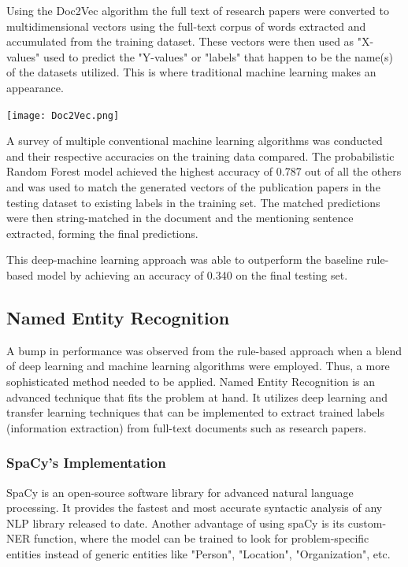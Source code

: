\documentclass[twocolumn]{article}
\begin{document}
Using the Doc2Vec algorithm the full text of research papers were converted to multidimensional vectors using the full-text corpus of words extracted and accumulated from the training dataset. These vectors were then used as "X-values" used to predict the "Y-values" or "labels" that happen to be the name(s) of the datasets utilized. This is where traditional machine learning makes an appearance.\par 

\begin{center}
\hspace*{-0.2cm}
\texttt{[image: Doc2Vec.png]}
\end{center}

A survey of multiple conventional machine learning algorithms was conducted and their respective accuracies on the training data compared. The probabilistic Random Forest model achieved the highest accuracy of 0.787 out of all the others and was used to match the generated vectors of the publication papers in the testing dataset to existing labels in the training set. The matched predictions were then string-matched in the document and the mentioning sentence extracted, forming the final predictions.\par

This deep-machine learning approach was able to outperform the baseline rule-based model by achieving an accuracy of 0.340 on the final testing set.
\subsection{Named Entity Recognition}
A bump in performance was observed from the rule-based approach when a blend of deep learning and machine learning algorithms were employed. Thus, a more sophisticated method needed to be applied. Named Entity Recognition is an advanced technique that fits the problem at hand. It utilizes deep learning and transfer learning techniques that can be implemented to extract trained labels (information extraction) from full-text documents such as research papers.\par

\subsubsection{SpaCy's Implementation}
SpaCy is an open-source software library for advanced natural language processing. It provides the fastest and most accurate syntactic analysis of any NLP library released to date. Another advantage of using spaCy is its custom-NER function, where the model can be trained to look for problem-specific entities instead of generic entities like "Person", "Location", "Organization", etc.\par
\end{document}
